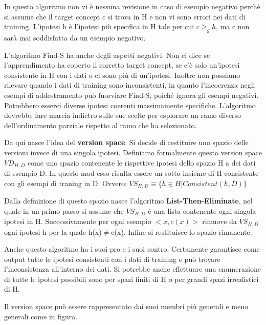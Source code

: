 \documentclass[a4paper]{extarticle}
\begin{document}
In questo algoritmo non vi è nessuna revisione in caso di esempio negativo perchè si assume che il target concept c si trova in H e non vi sono errori nei dati di training. L'ipotesi h è l'ipotesi più specifica in H tale per cui $ c \geq_g h$, ma c non sarà mai soddisfatta da un esempio negativo.

L'algoritmo Find-S ha anche degli aspetti negativi. Non ci dice se l'apprendimento ha coperto il corretto target concept, se c'è solo un'ipotesi consistente in H con i dati o ci sono più di un'ipotesi. Inoltre non possiamo rilevare quando i dati di training sono inconsistenti, in quanto l'incoerenza negli esempi di addestramento può fuorviare Find-S, poiché ignora gli esempi negativi. Potrebbero esserci diverse ipotesi coerenti massimamente specifiche. L'algoritmo dovrebbe fare marcia indietro sulle sue scelte per esplorare un ramo diverso dell'ordinamento parziale rispetto al ramo che ha selezionato.

Da qui nasce l'idea del \textbf{version space}. Si decide di restituire uno spazio delle versioni invece di una singola ipotesi. Definiamo formalmente questo version space $VD_{H,D}$ come uno spazio contenente le rispettive ipotesi dello spazio H a dei dati di esempio D. In questo mod esso risulta essere un sotto insieme di H consistente con gli esempi di traning in D. Ovvero: $VS_{H,D} \equiv \{ h \in H | Consistent(h,D)\}$

Dalla definizione di questo spazio nasce l'algoritmo \textbf{List-Then-Eliminate}, nel quale in un primo passo si assume che $VS_{H,D}$ è una lista contenente ogni singola ipotesi in H. Successivamente per ogni esempio $<x,c(x)>$ rimuove da $VS_{H,D}$ ogni ipotesi h per la quale h(x)$\not =$c(x). Infine si restituisce lo spazio rimanente.

Anche questo algoritmo ha i suoi pro e i suoi contro. Certamente garantisce come output tutte le ipotesi consistenti con i dati di training e può trovare l'inconsistenza all'interno dei dati. Si potrebbe anche effettuare una enumerazione di tutte le ipotesi possibili sono per spazi finiti di H o per grandi spazi irrealistici di H.

Il version space può essere rappresentato dai suoi membri più generali e meno generali come in figura.

\begin{center}


\end{center}
\end{document}

